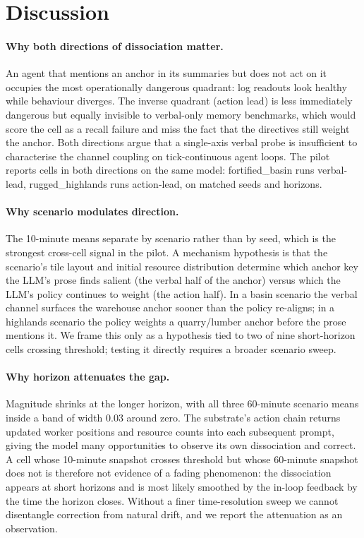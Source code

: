 \section{Discussion}
\label{sec:discussion}

\paragraph{Why both directions of dissociation matter.}
An agent that mentions an anchor in its summaries but does not
act on it occupies the most operationally dangerous quadrant: log
readouts look healthy while behaviour diverges. The inverse
quadrant (action lead) is less immediately dangerous but equally
invisible to verbal-only memory benchmarks, which would score the
cell as a recall failure and miss the fact that the directives
still weight the anchor. Both directions argue that a single-axis
verbal probe is insufficient to characterise the channel coupling
on tick-continuous agent loops. The pilot reports cells in both
directions on the same model: \textsf{fortified\_basin} runs
verbal-lead, \textsf{rugged\_highlands} runs action-lead, on
matched seeds and horizons.

\paragraph{Why scenario modulates direction.}
The 10-minute means separate by scenario rather than by seed,
which is the strongest cross-cell signal in the pilot. A mechanism
hypothesis is that the scenario's tile layout and initial
resource distribution determine which anchor key the LLM's prose
finds salient (the verbal half of the anchor) versus which the
LLM's policy continues to weight (the action half). In a basin
scenario the verbal channel surfaces the warehouse anchor sooner
than the policy re-aligns; in a highlands scenario the policy
weights a quarry/lumber anchor before the prose mentions it. We
frame this only as a hypothesis tied to two of nine short-horizon
cells crossing threshold; testing it directly requires a broader
scenario sweep.

\paragraph{Why horizon attenuates the gap.}
Magnitude shrinks at the longer horizon, with all three
60-minute scenario means inside a band of width $0.03$ around
zero. The substrate's action chain returns updated worker
positions and resource counts into each subsequent prompt, giving
the model many opportunities to observe its own dissociation and
correct. A cell whose 10-minute snapshot crosses threshold but
whose 60-minute snapshot does not is therefore not evidence of a
fading phenomenon: the dissociation appears at short horizons and
is most likely smoothed by the in-loop feedback by the time the
horizon closes. Without a finer time-resolution sweep we cannot
disentangle correction from natural drift, and we report the
attenuation as an observation.

